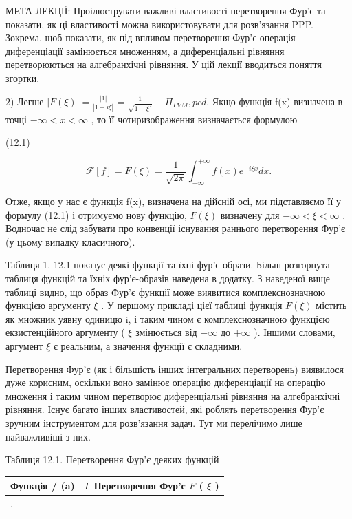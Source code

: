 \documentclass[
  ukrainian,
]{article}
\newcounter{none} %
\begin{document}
МЕТА ЛЕКЦІЇ: Проілюструвати важливі властивості перетворення Фур'є та
показати, як ці властивості можна використовувати для розв'язання PPP.
Зокрема, щоб показати, як під впливом перетворення Фур'є операція
диференціації замінюється множенням, а диференціальні рівняння
перетворюються на алгебранхічні рівняння. У цій лекції вводиться поняття
згортки.

2) Легше
\(|F(\xi)| = \frac{|1|}{|1+i\xi|} = \frac{1}{\sqrt{1+\xi^2}} - \Pi_{PVM}, pcd.\)
Якщо функція f(x) визначена в точці \(-\infty < x < \infty\) , то її
чотиризображення визначається формулою

(12.1)

\[
\mathcal{F}[f] = F(\xi) = \frac{1}{\sqrt{2\pi}} \int_{-\infty}^{+\infty} f(x) e^{-i\xi x} dx.
\]

Отже, якщо у нас є функція f(x), визначена на дійсній осі, ми
підставляємо її у формулу (12.1) і отримуємо нову функцію, \(F(\xi)\)
визначену для \(-\infty < \xi < \infty\) . Водночас не слід забувати про
конвенції існування раннього перетворення Фур'є (у цьому випадку
класичного).

Таблиця 1. 12.1 показує деякі функції та їхні фур'є-образи. Більш
розгорнута таблиця функцій та їхніх фур'є-образів наведена в додатку. З
наведеної вище таблиці видно, що образ Фур'є функції може виявитися
комплекснозначною функцією аргументу \(\xi\) . У першому прикладі цієї
таблиці функція \(F(\xi)\) містить як множник уявну одиницю i, і таким
чином є комплекснозначною функцією екзистенційного аргументу ( \(\xi\)
змінюється від \(-\infty\) до \(+\infty\) ). Іншими словами, аргумент
\(\xi\) є реальним, а значення функції є складними.

Перетворення Фур'є (як і більшість інших інтегральних перетворень)
виявилося дуже корисним, оскільки воно замінює операцію диференціації на
операцію множення і таким чином перетворює диференціальні рівняння на
алгебранхічні рівняння. Існує багато інших властивостей, які роблять
перетворення Фур'є зручним інструментом для розв'язання задач. Тут ми
перелічимо лише найважливіші з них.

Таблиця 12.1. Перетворення Фур'є деяких функцій

{\def\LTcaptype{none} %
\begin{longtable}[]{@{}
  >{\raggedright\arraybackslash}p{}
  >{\raggedright\arraybackslash}p{}@{}}
\toprule\noalign{}
\begin{minipage}[b]{\linewidth}\raggedright
Функція / (a)
\end{minipage} & \begin{minipage}[b]{\linewidth}\raggedright
\(\Gamma\) Перетворення Фур'є \(F\) ( \(\xi\) )
\end{minipage} \\
\midrule\noalign{}
\endhead
\bottomrule\noalign{}
\endlastfoot
1. & \\
\end{longtable}
}
\end{document}
